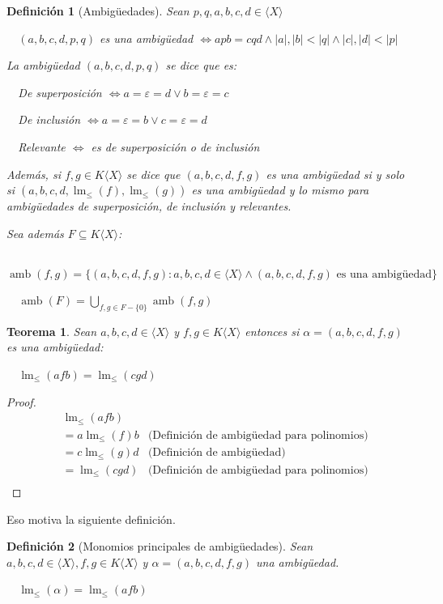 \documentclass{amsbook}
\theoremstyle{customstyle}
\newtheorem{definition}{Definición}[section]
\newtheorem{theorem}{Teorema}[section]
\DeclareMathOperator{\lm}{lm}
\DeclareMathOperator{\amb}{amb}
\begin{document}
\begin{definition}[Ambigüedades]
Sean $p, q, a, b, c, d ∈ ⟨X⟩$

  $(a, b, c, d, p, q)$ es una ambigüedad $ ⇔ apb = cqd ∧ |a|, |b| < |q| ∧ |c|, |d| < |p|$

La ambigüedad $(a, b, c, d, p, q)$ se dice que es:

  De superposición $⇔ a = ε = d ∨ b = ε = c$

  De inclusión $⇔ a = ε = b ∨ c = ε = d$

  Relevante $⇔$ es de superposición o de inclusión

Además, si $f, g ∈ K⟨X⟩$ se dice que $(a, b, c, d, f, g)$ es una ambigüedad si y solo si $(a, b, c, d, \lm_≤{(f)}, \lm_≤{(g)})$ es una ambigüedad y lo mismo para ambigüedades de superposición, de inclusión y relevantes.

Sea además $F ⊆ K⟨X⟩$:

  $\amb(f, g) = \{(a, b, c, d, f, g) : a, b, c, d ∈ ⟨X⟩ ∧ (a, b, c, d, f, g)\text{ es una ambigüedad}\}$

  $\amb(F) = \bigcup_{f, g ∈ F - \{0\}}{\amb(f, g)}$

\end{definition}

\begin{theorem}
Sean $a, b, c, d ∈ ⟨X⟩$ y $f, g ∈ K⟨X⟩$ entonces si $α = (a, b, c, d, f, g)$ es una ambigüedad:

  $\lm_≤{(afb)} = \lm_≤{(cgd)}$

\end{theorem}
\begin{proof}\
\begin{align*}
&\lm_≤{(afb)} &\\
& = a\lm_≤{(f)}b &\text{(Definición de ambigüedad para polinomios)} \\
& = c\lm_≤{(g)}d &\text{(Definición de ambigüedad)} \\
& = \lm_≤{(cgd)} &\text{(Definición de ambigüedad para polinomios)} \\
\end{align*}
\end{proof}

Eso motiva la siguiente definición.

\begin{definition}[Monomios principales de ambigüedades]
Sean $a, b, c, d ∈ ⟨X⟩, f, g ∈ K⟨X⟩$ y $α = (a, b, c, d, f, g)$ una ambigüedad.

  $\lm_≤{(α)} = \lm_≤{(afb)}$
\end{definition}
\end{document}
